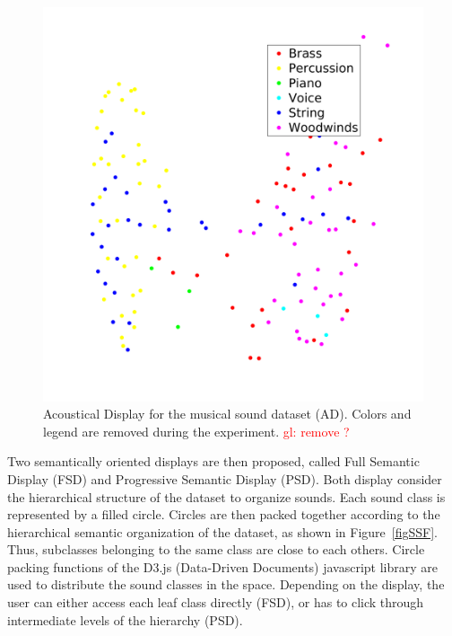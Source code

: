 \documentclass{aes2e}
\newcommand{\gl}[1]{\textcolor{red}{gl: #1}}
\begin{document}
\begin{figure}[t]
\begin{center}
\includegraphics[width=\columnwidth]{gfx/music_mds.png} 
\end{center}
\caption{\label{figXP3music} Acoustical Display for the musical sound dataset (AD). Colors and legend are removed during the experiment. \gl{remove ?}}
\end{figure}

Two semantically oriented displays are then proposed, called Full Semantic Display (FSD) and Progressive Semantic Display (PSD). Both display  consider the hierarchical structure of the dataset to organize sounds. Each sound class is represented by a filled circle. Circles are then packed together according to the hierarchical semantic organization of the dataset, as shown in Figure~\ref{figSSF}. Thus, subclasses belonging to the same class are close to each others. Circle packing functions of the D3.js (Data-Driven Documents) javascript library \cite{2011-d3} are used to distribute the sound classes in the space. Depending on the display, the user can either access each leaf class directly (FSD), or has to click through intermediate levels of the hierarchy (PSD). 
\end{document}
